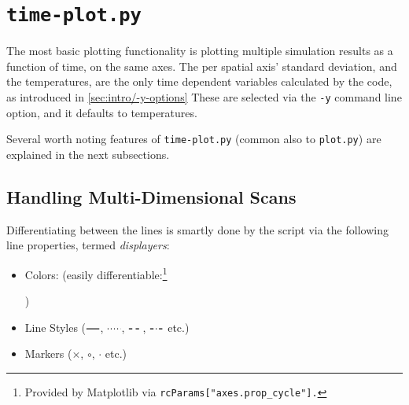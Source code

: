 \section{\texttt{time-plot.py}}

The most basic plotting functionality is plotting multiple simulation results as a function of time, on the same axes. The per spatial axis' standard deviation, and the temperatures, are the only time dependent variables calculated by the code, as introduced in \ref{sec:intro/-y-options} These are selected via the \texttt{-y} command line option, and it defaults to temperatures.

Several worth noting features of \texttt{time-plot.py} (common also to \texttt{plot.py}) are explained in the next subsections.

\subsection{Handling Multi-Dimensional Scans}

Differentiating between the lines is smartly done by the script via the following line properties, termed \textit{displayers}:

\begin{itemize}
	\item Colors: (easily differentiable:\footnote{Provided by Matplotlib via \texttt{rcParams["axes.prop\_cycle"].}} )
	\item Line Styles ($\tikz[baseline=-0.5ex]\draw[thick] (0,0) -- (0.4,0);$, $\tikz[baseline=-0.5ex]\draw[thick, dotted] (0,0) -- (0.4,0);$, $\tikz[baseline=-0.5ex]\draw[thick, dashed] (0,0) -- (0.4,0);$, $\tikz[baseline=-0.5ex]\draw[thick, dash dot] (0,0) -- (0.4,0);$ etc.)
	\item Markers ($\times$, $\circ$, $\cdot$ etc.)
\end{itemize}

